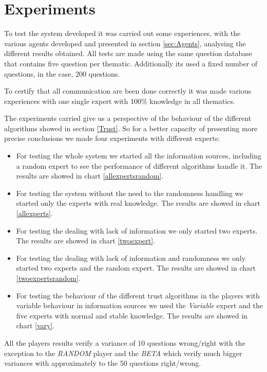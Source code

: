 \documentclass{llncs}
\begin{document}
\section{Experiments}\label{sec:Experiments}

To test the system developed it was carried out some experiences, with the various agents developed and presented in section \ref{sec:Agents}, analysing the different results obtained. All tests are made using the same question database that contains five question per thematic. Additionally its used a fixed number of questions, in the case, 200 questions.

To certify that all communication are been done correctly it was made various experiences with one single expert with 100\% knowledge in all thematics.

The experiments carried give us a perspective of the behaviour of the different algorithms showed in section \ref{Trust}. So for a better capacity of presenting more precise conclusions we made four experiments with different experts:
\begin{itemize}
\item For testing the whole system we started all the information sources, including a random expert to see the performance of different algorithms handle it. The results are showed in chart \ref{allexpertsrandom}.
\item For testing the system without the need to the randomness handling we started only the experts with real knowledge. The results are showed in chart \ref{allexperts}.
\item For testing the dealing with lack of information we only started two experts.  The results are showed in chart \ref{twoexpert}.
\item For testing the dealing with lack of information and randomness we only started two experts and the random expert.  The results are showed in chart \ref{twoexpertsrandom}.
\item For testing the behaviour of the different trust algorithms in the players with variable behaviour in information sources we used the \textit{Variable} expert and the five experts with normal and stable knowledge. The results are showed in chart \ref{vary}.
\end{itemize}

All the players results verify a variance of 10 questions wrong/right with the exception to the \textit{RANDOM} player and the \textit{BETA} which verify much bigger variances with approximately to the 50 questions right/wrong.
 
\end{document}
